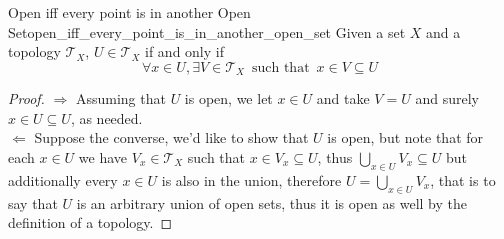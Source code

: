 \begin{proposition}{Open iff every point is in another Open
Set}{open_iff_every_point_is_in_another_open_set}
Given a set \( X \) and a topology \( \mathcal{ T } _{ X }   \), \( U \in
\mathcal{ T } _{ X }   \) if and only if 
\[
\forall x \in  U, \exists V \in  \mathcal{ T } _{ X } \enspace \text{such that}
\enspace x \in  V \subseteq U
\]
\end{proposition}
\begin{proof}
\( \Rightarrow  \) Assuming that \( U \) is open, we let \( x \in  U \) and take
\( V = U \) and surely \( x \in U \subseteq U \), as needed.\\
\( \Leftarrow  \) Suppose the converse, we'd like to show that \( U \) is open,
but note that for each \( x \in  U \) we have \( V _{ x } \in  \mathcal{ T } _{
X}   \) such that \( x \in V _{ x } \subseteq U \), thus \( \bigcup _{ x \in U }
V _{ x } \subseteq U \) but additionally every \( x \in U \) is also in the
union, therefore \( U = \bigcup _{ x \in  U } V _{ x }  \), that is to say that
\( U \) is an arbitrary union of open sets, thus it is open as well by the
definition of a topology.
\end{proof}
